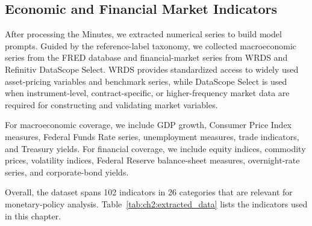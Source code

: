     







\subsection*{Economic and Financial Market Indicators}

After processing the Minutes, we extracted numerical series to build model prompts. Guided by the reference-label taxonomy, we collected macroeconomic series from the FRED database and financial-market series from WRDS and Refinitiv DataScope Select. WRDS provides standardized access to widely used asset-pricing variables and benchmark series, while DataScope Select is used when instrument-level, contract-specific, or higher-frequency market data are required for constructing and validating market variables.


For macroeconomic coverage, we include GDP growth, Consumer Price Index measures, Federal Funds Rate series, unemployment measures, trade indicators, and Treasury yields. For financial coverage, we include equity indices, commodity prices, volatility indices, Federal Reserve balance-sheet measures, overnight-rate series, and corporate-bond yields.


Overall, the dataset spans 102 indicators in 26 categories that are relevant for monetary-policy analysis. Table~\ref{tab:ch2:extracted_data} lists the indicators used in this chapter.


